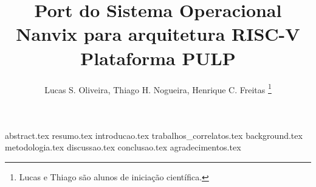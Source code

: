 \documentclass[12pt]{article}
\title{Port do Sistema Operacional Nanvix para arquitetura RISC-V Plataforma PULP}
\author{
       {Lucas S. Oliveira, Thiago H. Nogueira, Henrique C. Freitas}
       \thanks{Lucas e Thiago são alunos de iniciação científica.}
}
\begin{document}
    \maketitle

    {abstract.tex}
    {resumo.tex}
    {introducao.tex}
    {trabalhos_correlatos.tex}
    {background.tex}
    {metodologia.tex}
    {discussao.tex}
    {conclusao.tex}
    {agradecimentos.tex}    
    
    
    
\end{document}
